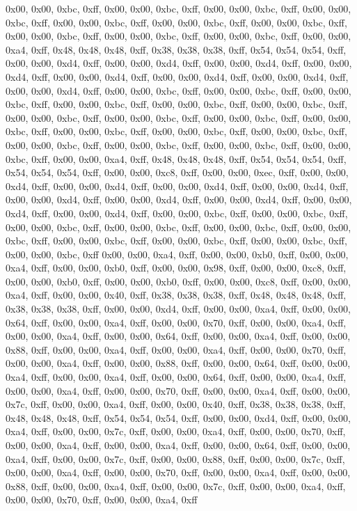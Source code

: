 0x00, 0x00, 0xbc, 0xff, 0x00, 0x00, 0xbc, 0xff, 0x00, 0x00, 0xbc, 0xff, 0x00, 0x00, 0xbc, 0xff, 0x00, 0x00, 0xbc, 0xff, 0x00, 0x00, 0xbc, 0xff, 0x00, 0x00, 0xbc, 0xff, 0x00, 0x00, 0xbc, 0xff, 0x00, 0x00, 0xbc, 0xff, 0x00, 0x00, 0xbc, 0xff, 0x00, 0x00, 0xa4, 0xff, 0x48, 0x48, 0x48, 0xff, 0x38, 0x38, 0x38, 0xff, 0x54, 0x54, 0x54, 0xff, 0x00, 0x00, 0xd4, 0xff, 0x00, 0x00, 0xd4, 0xff, 0x00, 0x00, 0xd4, 0xff, 0x00, 0x00, 0xd4, 0xff, 0x00, 0x00, 0xd4, 0xff, 0x00, 0x00, 0xd4, 0xff, 0x00, 0x00, 0xd4, 0xff, 0x00, 0x00, 0xd4, 0xff, 0x00, 0x00, 0xbc, 0xff, 0x00, 0x00, 0xbc, 0xff, 0x00, 0x00, 0xbc, 0xff, 0x00, 0x00, 0xbc, 0xff, 0x00, 0x00, 0xbc, 0xff, 0x00, 0x00, 0xbc, 0xff, 0x00, 0x00, 0xbc, 0xff, 0x00, 0x00, 0xbc, 0xff, 0x00, 0x00, 0xbc, 0xff, 0x00, 0x00, 0xbc, 0xff, 0x00, 0x00, 0xbc, 0xff, 0x00, 0x00, 0xbc, 0xff, 0x00, 0x00, 0xbc, 0xff, 0x00, 0x00, 0xbc, 0xff, 0x00, 0x00, 0xbc, 0xff, 0x00, 0x00, 0xbc, 0xff, 0x00, 0x00, 0xbc, 0xff, 0x00, 0x00, 0xa4, 0xff, 0x48, 0x48, 0x48, 0xff, 0x54, 0x54, 0x54, 0xff, 0x54, 0x54, 0x54, 0xff, 0x00, 0x00, 0xc8, 0xff, 0x00, 0x00, 0xec, 0xff, 0x00, 0x00, 0xd4, 0xff, 0x00, 0x00, 0xd4, 0xff, 0x00, 0x00, 0xd4, 0xff, 0x00, 0x00, 0xd4, 0xff, 0x00, 0x00, 0xd4, 0xff, 0x00, 0x00, 0xd4, 0xff, 0x00, 0x00, 0xd4, 0xff, 0x00, 0x00, 0xd4, 0xff, 0x00, 0x00, 0xd4, 0xff, 0x00, 0x00, 0xbc, 0xff, 0x00, 0x00, 0xbc, 0xff, 0x00, 0x00, 0xbc, 0xff, 0x00, 0x00, 0xbc, 0xff, 0x00, 0x00, 0xbc, 0xff, 0x00, 0x00, 0xbc, 0xff, 0x00, 0x00, 0xbc, 0xff, 0x00, 0x00, 0xbc, 0xff, 0x00, 0x00, 0xbc, 0xff, 0x00, 0x00, 0xbc, 0xff
0x00, 0x00, 0xa4, 0xff, 0x00, 0x00, 0xb0, 0xff, 0x00, 0x00, 0xa4, 0xff, 0x00, 0x00, 0xb0, 0xff, 0x00, 0x00, 0x98, 0xff, 0x00, 0x00, 0xc8, 0xff, 0x00, 0x00, 0xb0, 0xff, 0x00, 0x00, 0xb0, 0xff, 0x00, 0x00, 0xc8, 0xff, 0x00, 0x00, 0xa4, 0xff, 0x00, 0x00, 0x40, 0xff, 0x38, 0x38, 0x38, 0xff, 0x48, 0x48, 0x48, 0xff, 0x38, 0x38, 0x38, 0xff, 0x00, 0x00, 0xd4, 0xff, 0x00, 0x00, 0xa4, 0xff, 0x00, 0x00, 0x64, 0xff, 0x00, 0x00, 0xa4, 0xff, 0x00, 0x00, 0x70, 0xff, 0x00, 0x00, 0xa4, 0xff, 0x00, 0x00, 0xa4, 0xff, 0x00, 0x00, 0x64, 0xff, 0x00, 0x00, 0xa4, 0xff, 0x00, 0x00, 0x88, 0xff, 0x00, 0x00, 0xa4, 0xff, 0x00, 0x00, 0xa4, 0xff, 0x00, 0x00, 0x70, 0xff, 0x00, 0x00, 0xa4, 0xff, 0x00, 0x00, 0x88, 0xff, 0x00, 0x00, 0x64, 0xff, 0x00, 0x00, 0xa4, 0xff, 0x00, 0x00, 0xa4, 0xff, 0x00, 0x00, 0x64, 0xff, 0x00, 0x00, 0xa4, 0xff, 0x00, 0x00, 0xa4, 0xff, 0x00, 0x00, 0x70, 0xff, 0x00, 0x00, 0xa4, 0xff, 0x00, 0x00, 0x7c, 0xff, 0x00, 0x00, 0xa4, 0xff, 0x00, 0x00, 0x40, 0xff, 0x38, 0x38, 0x38, 0xff, 0x48, 0x48, 0x48, 0xff, 0x54, 0x54, 0x54, 0xff, 0x00, 0x00, 0xd4, 0xff, 0x00, 0x00, 0xa4, 0xff, 0x00, 0x00, 0x7c, 0xff, 0x00, 0x00, 0xa4, 0xff, 0x00, 0x00, 0x70, 0xff, 0x00, 0x00, 0xa4, 0xff, 0x00, 0x00, 0xa4, 0xff, 0x00, 0x00, 0x64, 0xff, 0x00, 0x00, 0xa4, 0xff, 0x00, 0x00, 0x7c, 0xff, 0x00, 0x00, 0x88, 0xff, 0x00, 0x00, 0x7c, 0xff, 0x00, 0x00, 0xa4, 0xff, 0x00, 0x00, 0x70, 0xff, 0x00, 0x00, 0xa4, 0xff, 0x00, 0x00, 0x88, 0xff, 0x00, 0x00, 0xa4, 0xff, 0x00, 0x00, 0x7c, 0xff, 0x00, 0x00, 0xa4, 0xff, 0x00, 0x00, 0x70, 0xff, 0x00, 0x00, 0xa4, 0xff
